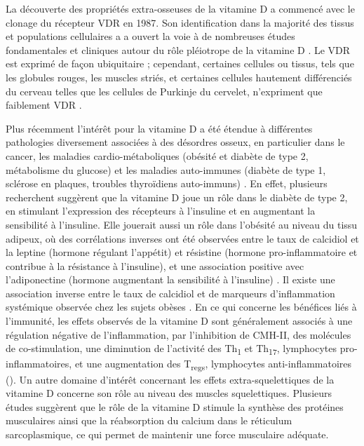 \documentclass[
  a4paper,
  DIV=11,
  numbers=noendperiod,
  listof=totoc]{scrreprt}
\begin{document}
La découverte des propriétés extra-osseuses de la vitamine D a commencé
avec le clonage du récepteur \ac{VDR} en 1987. Son identification dans
la majorité des tissus et populations cellulaires a a ouvert la voie à
de nombreuses études fondamentales et cliniques autour du rôle
pléiotrope de la vitamine D \autocite{Rosen.2012}. Le \ac{VDR} est
exprimé de façon ubiquitaire ; cependant, certaines cellules ou tissus,
tels que les globules rouges, les muscles striés, et certaines cellules
hautement différenciés du cerveau telles que les cellules de Purkinje du
cervelet, n'expriment que faiblement \ac{VDR} \autocite{Bouillon.2008}.

Plus récemment l'intérêt pour la vitamine D a été étendue à différentes
pathologies diversement associées à des désordres osseux, en particulier
dans le cancer, les maladies cardio-métaboliques (obésité et diabète de
type 2, métabolisme du glucose) et les maladies auto-immunes (diabète de
type 1, sclérose en plaques, troubles thyroïdiens auto-immuns)
\autocite{Dankers.2017,Caprio.2017}. En effet, plusieurs recherchent
suggèrent que la vitamine D joue un rôle dans le diabète de type 2, en
stimulant l'expression des récepteurs à l'insuline et en augmentant la
sensibilité à l'insuline. Elle jouerait aussi un rôle dans l'obésité au
niveau du tissu adipeux, où des corrélations inverses ont été observées
entre le taux de calcidiol et la leptine (hormone régulant l'appétit) et
résistine (hormone pro-inflammatoire et contribue à la résistance à
l'insuline), et une association positive avec l'adiponectine (hormone
augmentant la sensibilité à l'insuline)
\autocite{Caprio.2017,Bellia.2013}. Il existe une association inverse
entre le taux de calcidiol et de marqueurs d'inflammation systémique
observée chez les sujets obèses \autocite{Bellia.2013}. En ce qui
concerne les bénéfices liés à l'immunité, les effets observés de la
vitamine D sont généralement associés à une régulation négative de
l'inflammation, par l'inhibition de \ac{CMH-II}, des molécules de
co-stimulation, une diminution de l'activité des Th\textsubscript{1} et
Th\textsubscript{17}, lymphocytes pro-inflammatoires, et une
augmentation des T\textsubscript{regs}, lymphocytes anti-inflammatoires
(). Un autre domaine d'intérêt concernant les
effets extra-squelettiques de la vitamine D concerne son rôle au niveau
des muscles squelettiques. Plusieurs études suggèrent que le rôle de la
vitamine D stimule la synthèse des protéines musculaires ainsi que la
réabsorption du calcium dans le réticulum sarcoplasmique, ce qui permet
de maintenir une force musculaire adéquate\autocite{Caprio.2017}.
\end{document}
